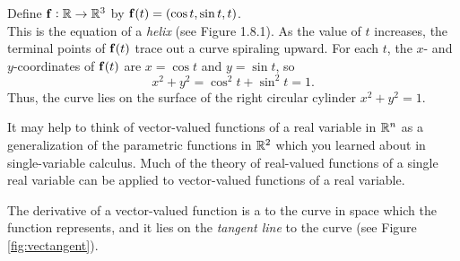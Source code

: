 \begin{exa}
 Define $\mathbf{ f}: \mathbb{R} \rightarrow \mathbb{R}^3$ by $\mathbf{ f}(t) = ( 
\cos t , \sin t , t )$.\\ This is
 the equation of a \emph{helix} (see Figure 1.8.1). As the value of $t$ increases, the terminal points of
 $\mathbf{ f}(t)$ trace out a curve spiraling upward. For each $t$, the $x$- and $y$-coordinates of $\mathbf{ f}(t)$
 are $x = \cos t$ and $y = \sin t$, so
 \begin{displaymath}
 x^2 + y^2 = \cos^2 t + \sin^2 t = 1.
 \end{displaymath}
 Thus, the curve lies on the surface of the right circular cylinder $x^2 + y^2 = 1$.
\end{exa}
\vspace{2mm}

It may help to think of vector-valued functions of a real variable in $\mathbb{R}^n$ as a generalization of the
parametric functions in $\mathbb{R}^2$ which you learned about in single-variable calculus.
Much of the theory of real-valued functions of a single real variable can be applied to vector-valued functions of a
real variable. 


The derivative of a vector-valued function is a
 to the curve in space which the 
function represents, and it lies on the
\emph{tangent line} to the curve (see
Figure \ref{fig:vectangent}).\vspace{-4mm}

